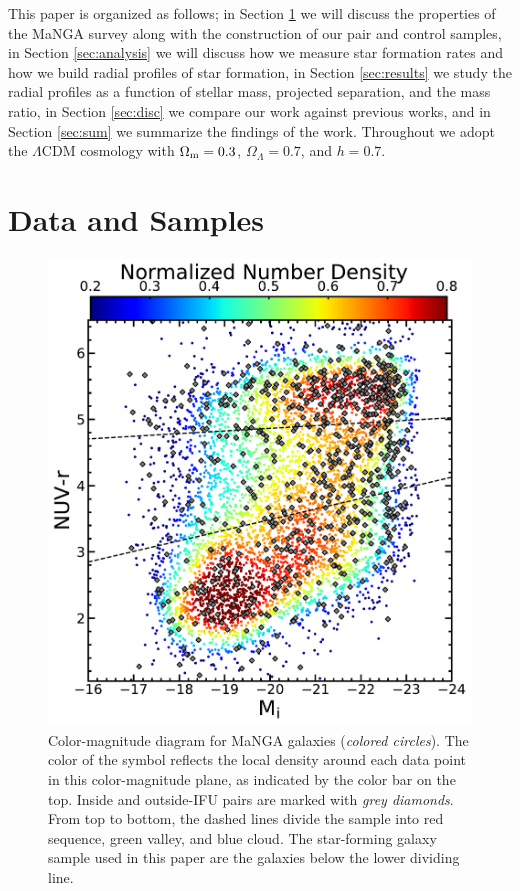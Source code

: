 \documentclass[iop,revtex4,twocolumn,apj,numberedappendix,appendixfloats]{emulateapj}
\begin{document}
This paper is organized as follows; in Section \ref{sec:data} we will discuss the properties of the MaNGA survey along with the construction of our pair and control samples, in Section \ref{sec:analysis} we will discuss how we measure star formation rates and how we build radial profiles of star formation, in Section \ref{sec:results} we study the radial profiles as a function of stellar mass, projected separation, and the mass ratio, in Section \ref{sec:disc} we compare our work against previous works, and in Section \ref{sec:sum} we summarize the findings of the work. 
Throughout we adopt the $\Lambda$CDM cosmology with $\Omega_{\rm m}=0.3$, $\Omega_\Lambda=0.7$, and $h=0.7$. 

\section{Data and Samples}\label{sec:data}

\begin{figure}
\centering
\includegraphics[width=\linewidth]{fig/color-mag.pdf}
\caption[]{Color-magnitude diagram for MaNGA galaxies ({\it colored circles}). The color of the symbol reflects the local density around each data point in this color-magnitude plane, as indicated by the color bar on the top. Inside and outside-IFU pairs are marked with {\it grey diamonds}. From top to bottom, the dashed lines divide the sample into red sequence, green valley, and blue cloud. The star-forming galaxy sample used in this paper are the galaxies below the lower dividing line.}
\label{fig:cmd}
\end{figure}
\end{document}

